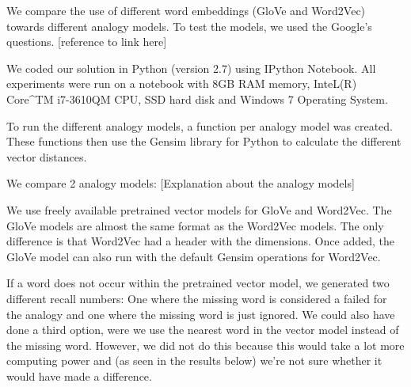 We compare the use of different word embeddings (GloVe and Word2Vec) towards different analogy models. To test the models, we used the Google's questions. [reference to link here]

We coded our solution in Python (version 2.7) using IPython Notebook. All experiments were run on a notebook with 8GB RAM memory, InteL(R) Core^{TM} i7-3610QM CPU, SSD hard disk and Windows 7 Operating System.

To run the different analogy models, a function per analogy model was created. These functions then use the Gensim library for Python to calculate the different vector distances.

We compare 2 analogy models:
[Explanation about the analogy models]

We use freely available pretrained vector models for GloVe and Word2Vec. The GloVe models are almost the same format as the Word2Vec models. The only difference is that Word2Vec had a header with the dimensions. Once added, the GloVe model can also run with the default Gensim operations for Word2Vec.

If a word does not occur within the pretrained vector model, we generated two different recall numbers: One where the missing word is considered a failed for the analogy and one where the missing word is just ignored. We could also have done a third option, were we use the nearest word in the vector model instead of the missing word. However, we did not do this because this would take a lot more computing power and (as seen in the results below) we're not sure whether it would have made a difference.
